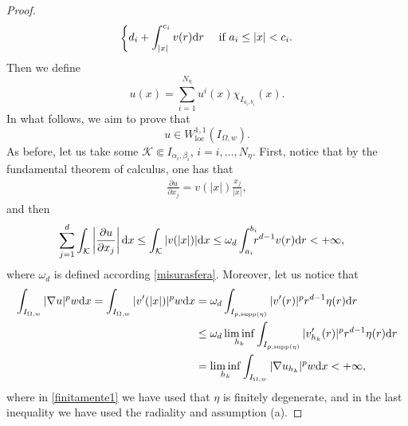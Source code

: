 \documentclass[11pt,leqno]{amsart}
\theoremstyle{remark}
\theoremstyle{definition}
\theoremstyle{definition}
\newcommand{\supp}{\mathrm{supp}}
\def\de{{\rm d}}
\begin{document}
\begin{proof}
\begin{equation*}
\begin{cases}
\displaystyle d_{i}+\int_{\vert x\vert}^{c_{i}}v(r)\de r&\text{ if } a_{i}\leq \vert x\vert<c_{i}.
\end{cases}
\end{equation*}
Then we define
$$
u(x)=\sum_{i=1}^{N_{\eta}} u^i(x)  \chi_{I_{a_{i},b_{i}}}(x) .
$$
In what follows, we aim to prove that
\begin{equation*}\label{aimed}
u\in W^{1,1}_{\text {loc}}(I_{\Omega, w}).
\end{equation*}
As before, let us take some $\mathcal{K}\Subset I_{\alpha_{i},\beta_{i}}$, $i=i,\ldots, N_{\eta}$. First, notice that by the fundamental theorem of calculus, one has that
\begin{align*}
\frac{\partial u}{\partial x_{j}}=v(\vert x\vert)\frac{x_{j}}{\vert x\vert},
\end{align*}
and then
\begin{align*}
\sum_{j=1}^{d}\displaystyle\int_{\mathcal{K}}\left\vert \frac{\partial u}{\partial x_{j}}\right\vert\de x\leq\displaystyle\int_{\mathcal{K}} \vert v(\vert x \vert)\vert \de x
&\leq \omega_{d}\displaystyle\int_{a_{i}}^{b_{i}}\hskip -0,2cm r^{d-1}v(r)\de r<+\infty,
\end{align*}
where $\omega_{d}$ is defined according \eqref{misurasfera}. Moreover, let us notice that 
\begin{align}\label{finitamente1}
\displaystyle \int_{I_{\Omega,w}}\vert \nabla u\vert^{p}w\de x=\displaystyle \int_{I_{\Omega,w}}\vert v'(\vert x\vert)\vert^{p}w\de x&=\omega_{d}\int_{I_{p,\supp(\eta)}}\vert v'(r)\vert^{p} r^{d-1}\eta(r) \de r\\
&\leq \omega_{d}\liminf_{h_{k}}\displaystyle\int_{I_{p,\supp(\eta)}}\vert v_{h_{k}}'(r)\vert^{p} r^{d-1}\eta(r) \de r\nonumber\\
&=\liminf_{h_{k}}\displaystyle\int_{I_{\Omega,w}}\vert \nabla u_{h_{k}}\vert^{p}w\de x<+\infty,\nonumber
\end{align}
where in \eqref{finitamente1} we have used that $\eta$ is finitely degenerate, and in the last inequality we have used the radiality and assumption (a).
\end{proof}
\end{document}
